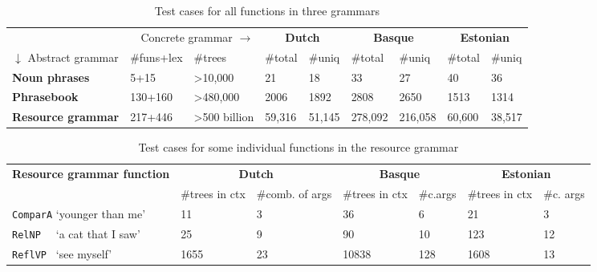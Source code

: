 \documentclass[11pt]{article}
\def\t#1{\texttt{#1}}
\begin{document}
\begin{table}[h]
\centering
\begin{tabular}{|lll|ll|ll|ll|}
\hline
\multicolumn{3}{|r}{Concrete grammar $\rightarrow$}              &
                                                                   \multicolumn{2}{|c}{\bf Dutch} & \multicolumn{2}{|c}{\bf Basque} & \multicolumn{2}{|c|}{\bf Estonian} \\
$\downarrow$ Abstract grammar & \#funs+lex & \#trees  &
                                                                 \#total & \#uniq & \#total & \#uniq  & \#total  & \#uniq \\ \hline
{\bf Noun phrases}     & 5+15          & \textgreater{}10,000          & 21    & 18     & 33      & 27      & 40       & 36     \\ \hline
{\bf Phrasebook}       & 130+160         & \textgreater{}480,000       & 2006  & 1892   & 2808    & 2650    & 1513     & 1314   \\ \hline
{\bf Resource grammar} & 217+446         & \textgreater{}500 billion   & 59,316 & 51,145  & 278,092  & 216,058  & 60,600    & 38,517   \\ \hline
\end{tabular}
\caption{Test cases for all functions in three grammars}
\label{results}
\end{table}

\begin{table}[h]
\centering
\begin{tabular}{|l|ll|ll|ll|}
\hline
{\bf Resource grammar function} &\multicolumn{2}{|c}{\bf Dutch} &
                                                                  \multicolumn{2}{|c}{\bf Basque} & \multicolumn{2}{|c|}{\bf Estonian} \\
                               &  \#trees in ctx & \#comb. of args
                                                                                                  &\#trees
                                                                                                    in
                                                                                                    ctx
                               & \#c.args & \#trees in ctx &
                                                                    \#c. args\\ \hline
\t{ComparA} `younger than me'  &  11      & 3     & 36     & 6     & 21      & 3   \\
\t{RelNP~~} `a cat that I saw' &  25      & 9     & 90     & 10    & 123     & 12 \\
 \t{ReflVP~} `see myself'      &  1655    & 23    & 10838  &  128  &1608     & 13   \\


\hline
\end{tabular}
\caption{Test cases for some individual functions in the resource grammar}
\label{results_indiv}
\end{table}
\end{document}
